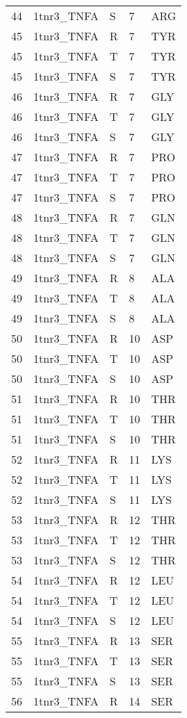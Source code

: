 \begin{tiny}
\begin{longtable}[l]{l|l|l|l|l}
	44 & 1tnr3\_TNFA & S & 7 & ARG \\
	45 & 1tnr3\_TNFA & R & 7 & TYR \\
	45 & 1tnr3\_TNFA & T & 7 & TYR \\
	45 & 1tnr3\_TNFA & S & 7 & TYR \\
	46 & 1tnr3\_TNFA & R & 7 & GLY \\
	46 & 1tnr3\_TNFA & T & 7 & GLY \\
	46 & 1tnr3\_TNFA & S & 7 & GLY \\
	47 & 1tnr3\_TNFA & R & 7 & PRO \\
	47 & 1tnr3\_TNFA & T & 7 & PRO \\
	47 & 1tnr3\_TNFA & S & 7 & PRO \\
	48 & 1tnr3\_TNFA & R & 7 & GLN \\
	48 & 1tnr3\_TNFA & T & 7 & GLN \\
	48 & 1tnr3\_TNFA & S & 7 & GLN \\
	49 & 1tnr3\_TNFA & R & 8 & ALA \\
	49 & 1tnr3\_TNFA & T & 8 & ALA \\
	49 & 1tnr3\_TNFA & S & 8 & ALA \\
	50 & 1tnr3\_TNFA & R & 10 & ASP \\
	50 & 1tnr3\_TNFA & T & 10 & ASP \\
	50 & 1tnr3\_TNFA & S & 10 & ASP \\
	51 & 1tnr3\_TNFA & R & 10 & THR \\
	51 & 1tnr3\_TNFA & T & 10 & THR \\
	51 & 1tnr3\_TNFA & S & 10 & THR \\
	52 & 1tnr3\_TNFA & R & 11 & LYS \\
	52 & 1tnr3\_TNFA & T & 11 & LYS \\
	52 & 1tnr3\_TNFA & S & 11 & LYS \\
	53 & 1tnr3\_TNFA & R & 12 & THR \\
	53 & 1tnr3\_TNFA & T & 12 & THR \\
	53 & 1tnr3\_TNFA & S & 12 & THR \\
	54 & 1tnr3\_TNFA & R & 12 & LEU \\
	54 & 1tnr3\_TNFA & T & 12 & LEU \\
	54 & 1tnr3\_TNFA & S & 12 & LEU \\
	55 & 1tnr3\_TNFA & R & 13 & SER \\
	55 & 1tnr3\_TNFA & T & 13 & SER \\
	55 & 1tnr3\_TNFA & S & 13 & SER \\
	56 & 1tnr3\_TNFA & R & 14 & SER \\

\end{longtable}
\end{tiny}
